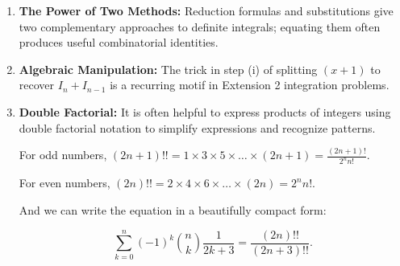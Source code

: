 \begin{takeaways}
\begin{enumerate}
    \item \textbf{The Power of Two Methods:} Reduction formulas and substitutions give two complementary approaches to definite integrals; equating them often produces useful combinatorial identities.
    \item \textbf{Algebraic Manipulation:} The trick in step (i) of splitting $(x+1)$ to recover $I_n + I_{n-1}$ is a recurring motif in Extension 2 integration problems.
    \item \textbf{Double Factorial:} It is often helpful to express products of integers using double factorial notation to simplify expressions and recognize patterns.
    
    For odd numbers, $(2n+1)!! = 1 \times 3 \times 5 \times \dots \times (2n+1) = \frac{(2n+1)!}{2^n n!}$.

    For even numbers, $(2n)!! = 2 \times 4 \times 6 \times \dots \times (2n) = 2^n n!$.

    And we can write the equation in a beautifully compact form:
    
      \[\sum_{k=0}^n (-1)^k \binom{n}{k}\frac{1}{2k+3} 
      = \frac{(2n)!!}{(2n+3)!!}.
    \]
\end{enumerate}
\end{takeaways}

